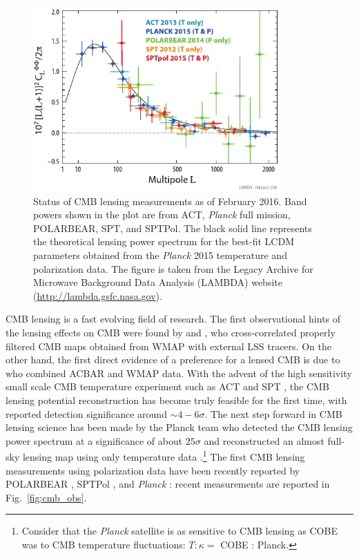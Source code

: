 \begin{figure}[t] %
\centering %
\includegraphics[width=0.85\textwidth]{Chapter1/Images/lensing_power_2016feb}
\caption{Status of CMB lensing measurements as of February 2016. Band powers shown in the plot are from ACT, \textit{Planck} full mission, POLARBEAR, SPT, and SPTPol. The black solid line represents the theoretical lensing power spectrum for the best-fit \gls{LCDM} parameters obtained from the \textit{Planck} 2015 temperature and polarization data. The figure is taken from the Legacy Archive for Microwave Background Data Analysis (LAMBDA) website (\url{http://lambda.gsfc.nasa.gov}). \label{fig:cmb_obs}}
\end{figure}

\gls{CMB} lensing is a fast evolving field of research. The first observational hints of the lensing effects on \gls{CMB}
were found by \cite{Smith2007} and \cite{Hirata2008}, who cross-correlated properly filtered \gls{CMB} maps obtained from
\gls{WMAP} with external \gls{LSS} tracers. On the other hand, the first direct evidence of a preference for a lensed
\gls{CMB} is due to \cite{Reichardt2009} who combined \gls{ACBAR} and \gls{WMAP} data. With the advent of the high
sensitivity small scale \gls{CMB} temperature experiment such as \gls{ACT} \citep{Das2011} and \gls{SPT} 
\citep{Keisler2011}, the \gls{CMB} lensing potential reconstruction has become truly feasible for the first time, with reported detection significance around $\sim4-6\sigma$. The next step forward in \gls{CMB} lensing science has 
been made by the Planck team who detected the \gls{CMB} lensing power spectrum at a significance of about
$25\sigma$ and reconstructed an almost full-sky lensing map using only temperature data 
\cite{Ade2014c}.\footnote{Consider that the \textit{Planck} satellite is as sensitive to \gls{CMB} lensing as \gls{COBE} was to \gls{CMB} temperature fluctuations: $T:\kappa = $ COBE : Planck.} The first \gls{CMB} lensing measurements using polarization data have been recently 
reported by POLARBEAR \citep{Ade2014e}, SPTPol \citep{Story2015}, and \textit{Planck} \citep{PlanckCollaboration2015}: recent measurements are reported in Fig.~\eqref{fig:cmb_obs}.

